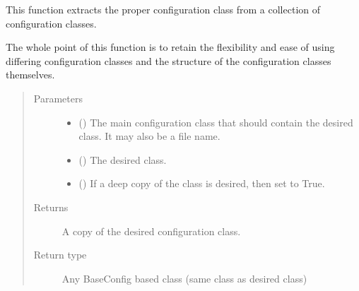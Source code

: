 \documentclass[letterpaper,10pt,english]{sphinxmanual}
\begin{document}

\begin{fulllineitems}
\label{\detokenize{python_docstrings/IfA_Smeargle.yankee.yankee_functions:IfA_Smeargle.yankee.yankee_functions.yankee_extract_proper_configuration_class}}
This function extracts the proper configuration class from a
collection of configuration classes.

The whole point of this function is to retain the flexibility and ease
of using differing configuration classes and the structure of the
configuration classes themselves.
\begin{quote}\begin{description}
\item[{Parameters}] \leavevmode\begin{itemize}
\item {} 
 () \textendash{} The main configuration class that should contain the desired class.
It may also be a file name.

\item {} 
 () \textendash{} The desired class.

\item {} 
 (\sphinxstyleliteralemphasis{\sphinxupquote{ (}}\sphinxstyleliteralemphasis{\sphinxupquote{)}}) \textendash{} If a deep copy of the class is desired, then set to True.

\end{itemize}

\item[{Returns}] \leavevmode
{} \textendash{} A copy of the desired configuration class.

\item[{Return type}] \leavevmode
Any BaseConfig based class (same class as desired class)

\end{description}\end{quote}

\end{fulllineitems}
\end{document}
